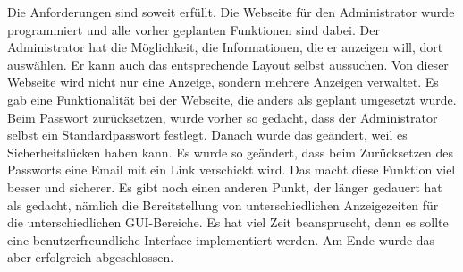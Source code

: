 Die Anforderungen sind soweit erfüllt. Die Webseite f\"ur den Administrator  wurde programmiert und alle vorher geplanten Funktionen sind dabei. Der Administrator hat die Möglichkeit, die Informationen, die er anzeigen will, dort auswählen. Er kann auch das entsprechende Layout selbst aussuchen. Von dieser Webseite wird nicht nur eine Anzeige, sondern mehrere Anzeigen verwaltet. Es gab eine Funktionalität bei der Webseite, die anders als geplant umgesetzt wurde. Beim Passwort zurücksetzen, wurde vorher so gedacht, dass der Administrator selbst ein Standardpasswort festlegt. Danach wurde das geändert, weil es Sicherheitslücken haben kann. Es wurde so geändert, dass beim Zurücksetzen des Passworts eine Email mit ein Link verschickt wird. Das macht diese Funktion viel besser und sicherer. Es gibt noch einen anderen Punkt, der länger gedauert hat als gedacht, n\"amlich die Bereitstellung von unterschiedlichen Anzeigezeiten für die unterschiedlichen GUI-Bereiche. Es hat viel Zeit beanspruscht, denn es sollte eine benutzerfreundliche Interface implementiert werden. Am Ende wurde das aber erfolgreich abgeschlossen.
